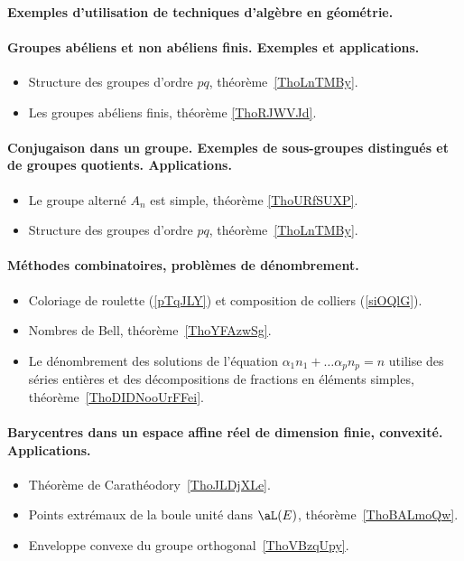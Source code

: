 \paragraph{Exemples d'utilisation de techniques d'algèbre en géométrie.}



\paragraph{Groupes abéliens et non abéliens finis. Exemples et applications.}
\begin{itemize}
    \item Structure des groupes d'ordre \( pq\), théorème~\ref{ThoLnTMBy}.
    \item Les groupes abéliens finis, théorème \ref{ThoRJWVJd}.
\end{itemize}
\paragraph{Conjugaison dans un groupe. Exemples  de  sous-groupes  distingués  et de groupes quotients. Applications.}
\begin{itemize}
    \item Le groupe alterné \( A_n\) est simple, théorème \ref{ThoURfSUXP}.
    \item Structure des groupes d'ordre \( pq\), théorème~\ref{ThoLnTMBy}.
\end{itemize}
\paragraph{Méthodes combinatoires, problèmes de dénombrement.}
\begin{itemize}
    \item Coloriage de roulette (\ref{pTqJLY}) et composition de colliers (\ref{siOQlG}).
    \item Nombres de Bell, théorème~\ref{ThoYFAzwSg}.
    \item Le dénombrement des solutions de l'équation \( \alpha_1 n_1+\ldots \alpha_pn_p=n\) utilise des séries entières et des décompositions de fractions en éléments simples, théorème~\ref{ThoDIDNooUrFFei}.
\end{itemize}
\paragraph{Barycentres dans un espace affine réel de dimension finie, convexité. Applications.}
\begin{itemize}
    \item Théorème de Carathéodory~\ref{ThoJLDjXLe}.
    \item Points extrémaux de la boule unité dans \( \aL(E)\), théorème~\ref{ThoBALmoQw}.
    \item Enveloppe convexe du groupe orthogonal~\ref{ThoVBzqUpy}.
\end{itemize}
